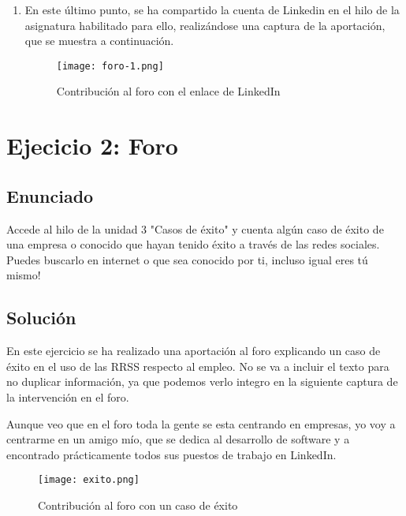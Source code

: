 \begin{enumerate}
    \item En este último punto, se ha compartido la cuenta de Linkedin en el hilo de la asignatura habilitado para ello, realizándose una captura de la aportación, que se muestra a continuación.

        \begin{figure}[H]
        \centering
        \texttt{[image: foro-1.png]}
        \caption{Contribución al foro con el enlace de LinkedIn}
    \end{figure}

\end{enumerate}

\section{Ejecicio 2: Foro}
\subsection{Enunciado}
Accede al hilo de la unidad 3  "Casos de éxito" y cuenta algún caso de éxito de una empresa o conocido  que hayan tenido éxito a través de las redes sociales. Puedes buscarlo en internet o que sea conocido por ti, incluso igual eres tú mismo!

\subsection{Solución}

En este ejercicio se ha realizado una aportación al foro explicando un caso de éxito en el uso de las RRSS respecto al empleo. No se va a incluir el texto para no duplicar información, ya que podemos verlo integro en la siguiente captura de la intervención en el foro.

Aunque veo que en el foro toda la gente se esta centrando en empresas, yo voy a centrarme en un amigo mío, que se dedica al desarrollo de software y a encontrado prácticamente todos sus puestos de trabajo en LinkedIn.


        \begin{figure}[H]
    \centering
    \texttt{[image: exito.png]}
    \caption{Contribución al foro con un caso de éxito}
\end{figure}



%
%

